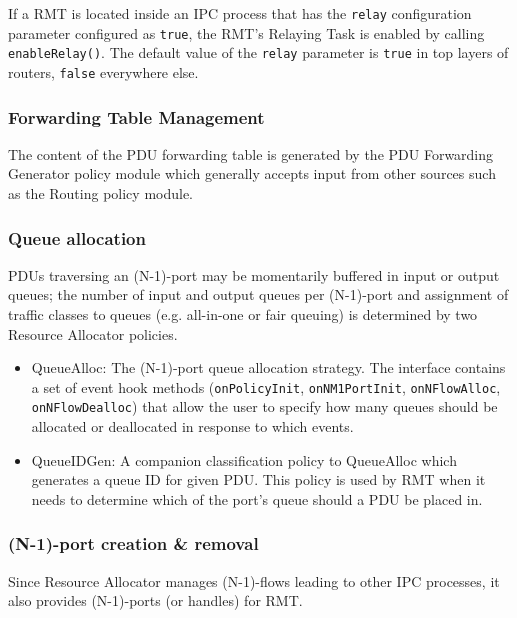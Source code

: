                 If a RMT is located inside an IPC process that has the \texttt{relay} configuration parameter configured as \texttt{true}, the RMT's Relaying Task is enabled by calling \texttt{enableRelay()}. The default value of the \texttt{relay} parameter is \texttt{true} in top layers of routers, \texttt{false} everywhere else.

            \subsubsection{Forwarding Table Management}

                The content of the PDU forwarding table is generated by the PDU Forwarding Generator policy module which generally accepts input from other sources such as the Routing policy module.

            \subsubsection{Queue allocation}

                PDUs traversing an (N-1)-port may be momentarily buffered in input or output queues; the number of input and output queues per (N-1)-port and assignment of traffic classes to queues (e.g. all-in-one or fair queuing)
                is determined by two Resource Allocator policies.

                \begin{itemize}
                    \item QueueAlloc: The (N-1)-port queue allocation strategy. The interface contains a set of event hook methods (\texttt{onPolicyInit}, \texttt{onNM1PortInit}, \texttt{onNFlowAlloc}, \texttt{onNFlowDealloc}) that allow the user to specify how many queues should be allocated or deallocated in response to which events.
                    \item QueueIDGen: A companion classification policy to QueueAlloc which generates a queue ID for given PDU. This policy is used by RMT when it needs to determine which of the port's queue should a PDU be placed in.
                \end{itemize}

            \subsubsection{(N-1)-port creation \& removal}

                Since Resource Allocator manages (N-1)-flows leading to other IPC processes, it also provides (N-1)-ports (or handles) for RMT.


